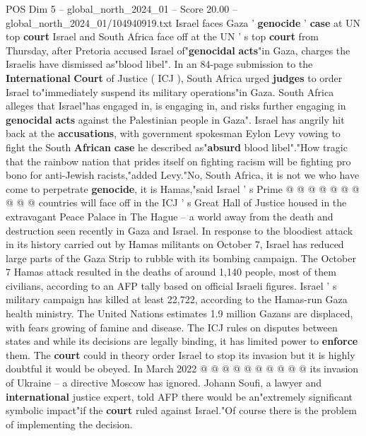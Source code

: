\begin{textsample}{POS Dim 5 – global\_north\_2024\_01 – Score 20.00 – global\_north\_2024\_01/104940919.txt}  \label{ex:f5_pos_116}
Israel faces Gaza ' \textbf{genocide} ' \textbf{case} at UN top \textbf{court} Israel and South Africa face off at the UN ' s top \textbf{court} from Thursday, after Pretoria accused Israel of"\textbf{genocidal} \textbf{acts}"in Gaza, charges the Israelis have dismissed as"blood libel".
In an 84-page submission to the \textbf{International} \textbf{Court} of Justice ( ICJ ), South Africa urged \textbf{judges} to order Israel to"immediately suspend its military operations"in Gaza.
South Africa alleges that Israel"has engaged in, is engaging in, and risks further engaging in \textbf{genocidal} \textbf{acts} against the Palestinian people in Gaza".
Israel has angrily hit back at the \textbf{accusations}, with government spokesman Eylon Levy vowing to fight the South \textbf{African} \textbf{case} he described as"\textbf{absurd} blood libel"."How tragic that the rainbow nation that prides itself on fighting racism will be fighting pro bono for anti-Jewish racists,"added Levy."No, South Africa, it is not we who have come to perpetrate \textbf{genocide}, it is Hamas,"said Israel ' s Prime @ @ @ @ @ @ @ @ @ @ countries will face off in the ICJ ' s Great Hall of Justice housed in the extravagant Peace Palace in The Hague -- a world away from the death and destruction seen recently in Gaza and Israel.
In response to the bloodiest attack in its history carried out by Hamas militants on October 7, Israel has reduced large parts of the Gaza Strip to rubble with its bombing campaign.
The October 7 Hamas attack resulted in the deaths of around 1,140 people, most of them civilians, according to an AFP tally based on official Israeli figures.
Israel ' s military campaign has killed at least 22,722, according to the Hamas-run Gaza health ministry.
The United Nations estimates 1.9 million Gazans are displaced, with fears growing of famine and disease.
The ICJ rules on disputes between states and while its decisions are legally binding, it has limited power to \textbf{enforce} them.
The \textbf{court} could in theory order Israel to stop its invasion but it is highly doubtful it would be obeyed.
In March 2022 @ @ @ @ @ @ @ @ @ @ its invasion of Ukraine -- a directive Moscow has ignored.
Johann Soufi, a lawyer and \textbf{international} justice expert, told AFP there would be an"extremely significant symbolic impact"if the \textbf{court} ruled against Israel."Of course there is the problem of implementing the decision.

\end{textsample}
